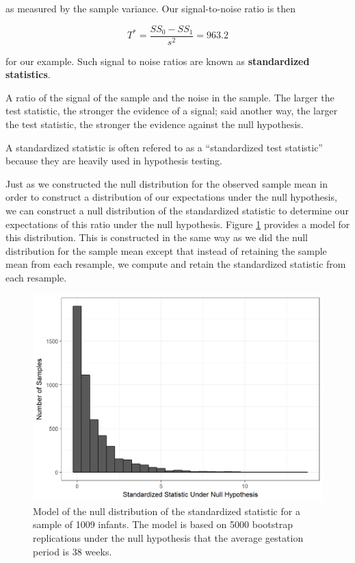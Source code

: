 \documentclass[]{book}
\theoremstyle{plain}
\theoremstyle{mydefn}
\theoremstyle{myexmpl}
\theoremstyle{remark}
\let\BeginKnitrBlock\begin \let\EndKnitrBlock\end
\let\BeginKnitrBlock\begin \let\EndKnitrBlock\end
\begin{document}
as measured by the sample variance. Our signal-to-noise ratio is then

\[T^* = \frac{SS_0 - SS_1}{s^2} = 963.2\]

for our example. Such signal to noise ratios are known as
\textbf{standardized statistics}.

\BeginKnitrBlock{definition}[Standardized Statistic]
\protect\hypertarget{def:defn-standardized-test-statistic}{}{\label{def:defn-standardized-test-statistic}
{} }A ratio of the signal of the
sample and the noise in the sample. The larger the test statistic, the
stronger the evidence of a signal; said another way, the larger the test
statistic, the stronger the evidence against the null hypothesis.
\EndKnitrBlock{definition}

\BeginKnitrBlock{rmdtip}
A standardized statistic is often refered to as a ``standardized test
statistic'' because they are heavily used in hypothesis testing.
\EndKnitrBlock{rmdtip}

Just as we constructed the null distribution for the observed sample
mean in order to construct a distribution of our expectations under the
null hypothesis, we can construct a null distribution of the
standardized statistic to determine our expectations of this ratio under
the null hypothesis. Figure \ref{fig:singleteststat-null} provides a
model for this distribution. This is constructed in the same way as we
did the null distribution for the sample mean except that instead of
retaining the sample mean from each resample, we compute and retain the
standardized statistic from each resample.

\begin{figure}

{\centering \includegraphics[width=0.8\linewidth]{./Images/singleteststat-null-1} 

}

\caption{Model of the null distribution of the standardized statistic for a sample of 1009 infants. The model is based on 5000 bootstrap replications under the null hypothesis that the average gestation period is 38 weeks.}\label{fig:singleteststat-null}
\end{figure}
\end{document}
